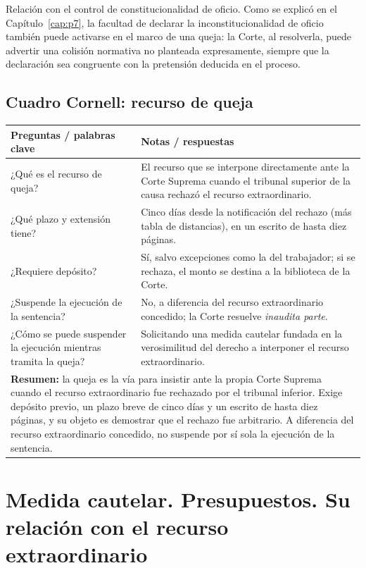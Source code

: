 \documentclass[12pt,oneside]{book}
\begin{document}
\begin{impbox}
Relación con el control de constitucionalidad de oficio. Como se explicó en el
Capítulo~\ref{cap:p7}, la facultad de declarar la inconstitucionalidad de oficio
también puede activarse en el marco de una queja: la Corte, al resolverla, puede
advertir una colisión normativa no planteada expresamente, siempre que la
declaración sea congruente con la pretensión deducida en el proceso.
\end{impbox}

\section{Cuadro Cornell: recurso de queja}

\begin{longtable}{@{}p{}p{}@{}}
\toprule
\textbf{Preguntas / palabras clave} & \textbf{Notas / respuestas} \\
\midrule
\endhead
¿Qué es el recurso de queja? & El recurso que se interpone directamente ante la
Corte Suprema cuando el tribunal superior de la causa rechazó el recurso
extraordinario. \\
¿Qué plazo y extensión tiene? & Cinco días desde la notificación del rechazo (más
tabla de distancias), en un escrito de hasta diez páginas. \\
¿Requiere depósito? & Sí, salvo excepciones como la del trabajador; si se
rechaza, el monto se destina a la biblioteca de la Corte. \\
¿Suspende la ejecución de la sentencia? & No, a diferencia del recurso
extraordinario concedido; la Corte resuelve \textit{inaudita parte}. \\
¿Cómo se puede suspender la ejecución mientras tramita la queja? & Solicitando
una medida cautelar fundada en la verosimilitud del derecho a interponer el
recurso extraordinario. \\
\midrule
\multicolumn{2}{p{0.95\textwidth}}{\textbf{Resumen:} la queja es la vía para
insistir ante la propia Corte Suprema cuando el recurso extraordinario fue
rechazado por el tribunal inferior. Exige depósito previo, un plazo breve de
cinco días y un escrito de hasta diez páginas, y su objeto es demostrar que el
rechazo fue arbitrario. A diferencia del recurso extraordinario concedido, no
suspende por sí sola la ejecución de la sentencia.} \\
\bottomrule
\end{longtable}


\chapter{Medida cautelar. Presupuestos. Su relación con el recurso extraordinario}
\label{cap:p10}
\end{document}
